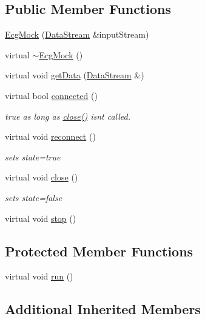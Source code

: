 \subsection*{Public Member Functions}
\begin{DoxyCompactItemize}
\item 
\hyperlink{classEcgMock_a880936385845728f4d96a54848d8ab6e}{Ecg\+Mock} (\hyperlink{classDataStream}{Data\+Stream} \&input\+Stream)
\item 
virtual \hyperlink{classEcgMock_a977966ab6184171d95c9f9c01eca0c7a}{$\sim$\+Ecg\+Mock} ()
\item 
virtual void \hyperlink{classEcgMock_aaa2628c0e8364980e6f252dfc3b86d1a}{get\+Data} (\hyperlink{classDataStream}{Data\+Stream} \&)
\item 
virtual bool \hyperlink{classEcgMock_ab5e3aac9d92b52b23fafb6e540902f28}{connected} ()
\begin{DoxyCompactList}\small\item\em true as long as \hyperlink{classEcgMock_a34af13005b5ea44386b7b875b72e9fc3}{close()} isn\textquotesingle{}t called. \end{DoxyCompactList}\item 
virtual void \hyperlink{classEcgMock_aed480e6edc6016917a5663f61b3a5091}{reconnect} ()
\begin{DoxyCompactList}\small\item\em sets state=true \end{DoxyCompactList}\item 
virtual void \hyperlink{classEcgMock_a34af13005b5ea44386b7b875b72e9fc3}{close} ()
\begin{DoxyCompactList}\small\item\em sets state=false \end{DoxyCompactList}\item 
virtual void \hyperlink{classEcgMock_aa65eb7c062913402c77ed1dc628168a7}{stop} ()
\end{DoxyCompactItemize}
\subsection*{Protected Member Functions}
\begin{DoxyCompactItemize}
\item 
virtual void \hyperlink{classEcgMock_a8822f99759fcfe9648262007cb380daa}{run} ()
\end{DoxyCompactItemize}
\subsection*{Additional Inherited Members}


